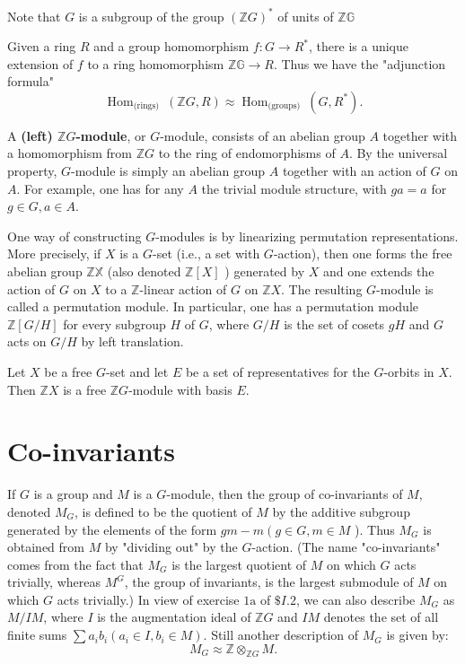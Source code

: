Note that $G$ is a subgroup of the group $(\mathbb{Z} G)^*$ of units of $\mathbb{Z G}$ 

\begin{theo}
Given a ring $R$ and a group homomorphism $f: G \rightarrow R^*$, there is a unique extension of $f$ to a ring homomorphism $\mathbb{Z G} \rightarrow R$. Thus we have the "adjunction formula"
    $$
    \operatorname{Hom}_{\text {(rings) }}(\mathbb{Z} G, R) \approx \operatorname{Hom}_{\text {(groups) }}\left(G, R^*\right) .
    $$
\end{theo}

A \textbf{(left) $\mathbb{Z} G$-module}, or $G$-module, consists of an abelian group $A$ together with a homomorphism from $\mathbb{Z} G$ to the ring of endomorphisms of $A$. By the universal property, $G$-module is simply an abelian group $A$ together with an action of $G$ on $A$. For example, one has for any $A$ the trivial module structure, with $g a=a$ for $g \in G, a \in A$.

One way of constructing $G$-modules is by linearizing permutation representations. More precisely, if $X$ is a $G$-set (i.e., a set with $G$-action), then one forms the free abelian group $\mathbb{Z X}$ (also denoted $\mathbb{Z}[X]$ ) generated by $X$ and one extends the action of $G$ on $X$ to a $\mathbb{Z}$-linear action of $G$ on $\mathbb{Z} X$. The resulting $G$-module is called a permutation module. In particular, one has a permutation module $\mathbb{Z}[G / H]$ for every subgroup $H$ of $G$, where $G / H$ is the set of cosets $g H$ and $G$ acts on $G / H$ by left translation.

\begin{prop}
Let $X$ be a free $G$-set and let $E$ be a set of representatives for the $G$-orbits in $X$. Then $\mathbb{Z}X$ is a free $\mathbb{Z}G$-module with basis $E$.
\end{prop}


\section{Co-invariants}
If $G$ is a group and $M$ is a $G$-module, then the group of co-invariants of $M$, denoted $M_G$, is defined to be the quotient of $M$ by the additive subgroup generated by the elements of the form $g m-m\left(g \in G, m \in M\right.$ ). Thus $M_G$ is obtained from $M$ by "dividing out" by the $G$-action. (The name "co-invariants" comes from the fact that $M_G$ is the largest quotient of $M$ on which $G$ acts trivially, whereas $M^G$, the group of invariants, is the largest submodule of $M$ on which $G$ acts trivially.) In view of exercise $1 \mathrm{a}$ of $\$ I .2$, we can also describe $M_G$ as $M / I M$, where $I$ is the augmentation ideal of $\mathbb{Z} G$ and $I M$ denotes the set of all finite sums $\sum a_i b_i\left(a_i \in I, b_i \in M\right)$.
Still another description of $M_G$ is given by:
$$
M_G \approx \mathbb{Z} \otimes_{\mathbb{Z} G} M .
$$


